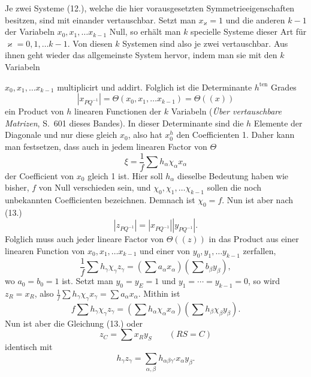 \documentclass[11pt]{article}
\begin{document}
Je zwei Systeme (12.), welche die hier vorausgesetzten Symmetrieeigenschaften besitzen, sind mit einander vertauschbar. Setzt man $x_\varkappa=1$ und die anderen $k-1$ der Variabeln $x_0,x_1,\ldots x_{k-1}$ Null, so erhält man $k$ specielle Systeme dieser Art für $\varkappa=0,1,\ldots k-1$. Von diesen $k$ Systemen sind also je zwei vertauschbar. Aus ihnen geht wieder das allgemeinste System hervor, indem man sie mit den $k$ Variabeln


$x_0,x_1,\ldots x_{k-1}$ multiplicirt und addirt. Folglich ist die Determinante $h^{\text{ten}}$ Grades
\begin{equation*}\tag{14.}
\left|x_{PQ^{-1}}\right|=\Theta(x_0,x_1,\ldots x_{k-1})=\Theta((x))
\end{equation*}
ein Product von $h$ linearen Functionen der $k$ Variabeln (\emph{Über vertauschbare Matrizen}, S.~601 dieses Bandes). In dieser Determinante sind die $h$ Elemente der Diagonale und nur diese gleich $x_0$, also hat $x_0^h$ den Coefficienten 1. Daher kann man festsetzen, dass auch in jedem linearen Factor von $\Theta$
\begin{equation*}\tag{15.}
\xi=\frac{1}{f}\sum h_\alpha\chi_\alpha x_\alpha
\end{equation*}
der Coefficient von $x_0$ gleich 1 ist. Hier soll $h_\alpha$ dieselbe Bedeutung haben wie bisher, $f$ von Null verschieden sein, und $\chi_0,\chi_1,\ldots\chi_{k-1}$ sollen die noch unbekannten Coefficienten bezeichnen. Demnach ist $\chi_0=f$. Nun ist aber nach (13.)
\[
\left|z_{PQ^{-1}}\right|=\left|x_{PQ^{-1}}\right|\left|y_{PQ^{-1}}\right|.
\]
Folglich muss auch jeder lineare Factor von $\Theta((z))$ in das Product aus einer linearen Function von $x_0,x_1,\ldots x_{k-1}$ und einer von $y_0,y_1,\ldots y_{k-1}$ zerfallen,
\[
\frac{1}{f}\sum h_\gamma\chi_\gamma z_\gamma=\left(\sum a_\alpha x_\alpha\right)\left(\sum b_\beta y_\beta\right),
\]
wo $a_0=b_0=1$ ist. Setzt man $y_0=y_E=1$ und $y_1=\cdots=y_{k-1}=0$, so wird $z_R=x_R$, also $\frac{1}{f}\sum h_\gamma\chi_\gamma x_\gamma=\sum a_\alpha x_\alpha$. Mithin ist
\begin{equation*}\tag{16.}
f\sum h_\gamma\chi_\gamma z_\gamma=\left(\sum h_\alpha\chi_\alpha x_\alpha\right)\left(\sum h_\beta\chi_\beta y_\beta\right).
\end{equation*}
Nun ist aber die Gleichung (13.) oder
\begin{equation*}\tag{17.}
z_C=\sum x_Ry_S\qquad(RS=C)
\end{equation*}
identisch mit
\begin{equation*}\tag{18.}
h_\gamma z_\gamma=\sum_{\alpha,\beta}h_{\alpha\beta\gamma'}x_\alpha y_\beta.
\end{equation*}
\end{document}
